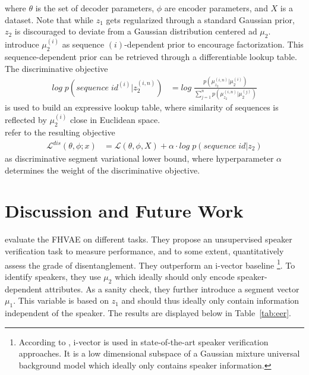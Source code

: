 \documentclass{article} %
\begin{document}
where $\theta$ is the set of decoder parameters, $\phi$ are encoder parameters, and $X$ is a dataset. Note that while $z_1$ gets regularized through a standard Gaussian prior, $z_2$ is discouraged to deviate from a Gaussian distribution centered ad $\mu_2$. \citet{hsu2017unsupervised} introduce $\mu_{2}^{(i)}$ as sequence $(i)$-dependent prior to encourage factorization. This sequence-dependent prior can be retrieved through a differentiable lookup table. The discriminative objective 
\begin{align*}
log\;p(sequence\;id^{(i)} | z_2^{(i,n)})& = log\;\frac{p(\mu_{z_2}^{(i,n)}|\mu_2^{(i)})}{\sum^{n}_{j=1}	p(\mu_{z_2}^{(i,n)}|\mu_2^{(j)})}
\end{align*}
is used to build an expressive lookup table, where similarity of sequences is reflected by $\mu_{2}^{(i)}$ close in Euclidean space.\\
\citet{hsu2017unsupervised} refer to the resulting objective
\begin{align*}
\mathcal{L}^{dis}(\theta, \phi;x)& = \mathcal{L}(\theta, \phi, X) + \alpha \cdot log\;p(sequence\;id | z_2)
\end{align*}
as discriminative segment variational lower bound, where hyperparameter $\alpha$ determines the weight of the discriminative objective.




\section*{Discussion and Future Work}
\citet{hsu2017unsupervised} evaluate the FHVAE on different tasks. They propose an unsupervised speaker verification task to measure performance, and to some extent, quantitatively assess the grade of disentanglement. They outperform an i-vector baseline \footnote{According to \citet{hsu2017unsupervised}, i-vector is used in state-of-the-art speaker verification approaches. It is a low dimensional subspace of a Gaussian mixture universal background model which ideally only contains speaker information.}. To identify speakers, they use $\mu_2$ which ideally should only encode speaker-dependent attributes. As a sanity check, they further introduce a segment vector $\mu_1$. This variable is based on $z_1$ and should thus ideally only contain information independent of the speaker. The results are displayed below in Table~\ref{tab:eer}.
\end{document}
